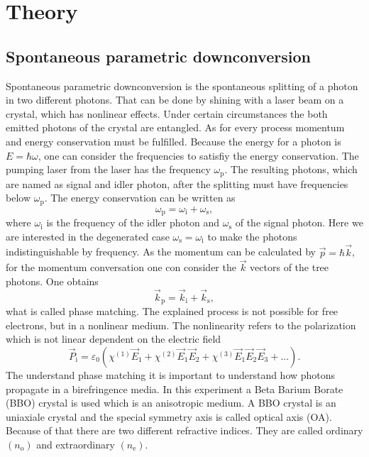 \section{Theory}
\subsection{Spontaneous parametric downconversion}\label{sec:SPD}
Spontaneous parametric downconversion is the spontaneous splitting of a photon in two different photons. That can be done by shining with a laser beam on a crystal, which has nonlinear effects. Under certain circumstances the both emitted photons of the crystal are entangled. 
As for every process momentum and energy conservation must be fulfilled. Because the energy for a photon is $E = \hbar \omega$, one can consider the frequencies to satisfiy the energy conservation. The pumping laser from the laser has the frequency $\omega_{\mathrm{p}}$. The resulting photons, which are named as signal and idler photon, after the splitting must have frequencies below $\omega_{\mathrm{p}}$. The energy conservation can be written as
\begin{equation}
    \omega_{\mathrm{p}} = \omega_{\mathrm{i}} + \omega_{\mathrm{s}},
\end{equation}
where $\omega_{\mathrm{i}}$ is the frequency of the idler photon and $\omega_{\mathrm{s}}$ of the signal photon. Here we are interested in the degenerated case $ \omega_{\mathrm{s}} = \omega_{\mathrm{i}}$ to make the photons indistinguishable by frequency. 
As the momentum can be calculated by $\vec{p} = \hbar \vec{k}$, for  the momentum conversation one con consider the $\vec{k}$ vectors of the tree photons. One obtains
\begin{equation}
    \vec{k}_{\mathrm{p}} =  \vec{k}_{\mathrm{i}}  + \vec{k}_{\mathrm{s}},
    \label{eq:phase_matching}
\end{equation}
what is called phase matching. 
The explained process is not possible for free electrons, but in a nonlinear medium. The nonlinearity refers to the polarization which is not linear dependent on the electric field
\begin{equation}
    \vec{P}_{\mathrm{i}} = \varepsilon_0 \left( 
      \chi^{(1)} \vec{E}_1 
    + \chi^{(2)} \vec{E}_1 \vec{E}_2 
    + \chi^{(3)} \vec{E}_1 \vec{E}_2 \vec{E}_3 + ... 
    \right).
\end{equation}
The understand phase matching it is important to understand how photons propagate in a birefringence media. In this experiment a Beta Barium Borate (BBO) crystal is used which is an anisotropic medium. A BBO crystal is an uniaxiale crystal and the special symmetry axis is called optical axis (OA).  Because of that there are two different refractive indices. They are called ordinary $(n_{\mathrm{o}})$ and extraordinary $(n_{\mathrm{e}})$. 
